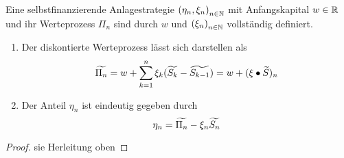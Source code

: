\begin{lemma} %
	Eine selbstfinanzierende Anlagestrategie $\left( \eta_n, \xi_n \right)_{n \in \mathbb{N}}$ mit Anfangskapital $w \in \mathbb{R}$ und ihr Werteprozess $\Pi_n$ sind durch $w$ und $\left( \xi_n \right)_{n \in \mathbb{N}}$ vollständig definiert. 
	\begin{enumerate}[label=(\alph*), leftmargin=*, nolistsep, topsep=-\parskip]
		\item Der diskontierte Werteprozess lässt sich darstellen als
		\begin{equation*}
		\widetilde{\Pi_n} = w + \sum_{k=1}^n \xi_k (\widetilde{S_k} - \widetilde{S_{k-1}}) = w + (\xi \bullet \widetilde{S})_n
		\end{equation*}
		\item Der Anteil $\eta_n$ ist eindeutig gegeben durch
		\begin{equation*}
		\eta_n = \widetilde{\Pi_n} - \xi_n \widetilde{S_n}
		\end{equation*}
	\end{enumerate}
\end{lemma}
\begin{proof}
	sie Herleitung oben
\end{proof}

